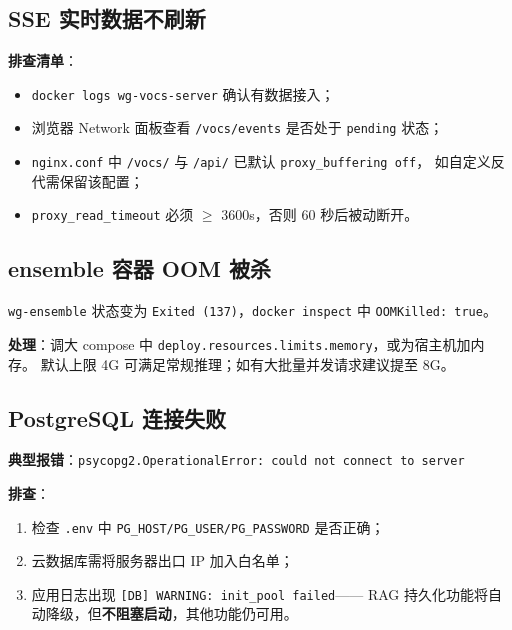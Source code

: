 \documentclass[UTF8,a4paper,11pt]{ctexart}
\begin{document}
\subsection{SSE 实时数据不刷新}

\textbf{排查清单}：
\begin{itemize}[leftmargin=1.4em,itemsep=2pt]
  \item \texttt{docker logs wg-vocs-server} 确认有数据接入；
  \item 浏览器 Network 面板查看 \texttt{/vocs/events} 是否处于 \texttt{pending} 状态；
  \item \texttt{nginx.conf} 中 \texttt{/vocs/} 与 \texttt{/api/} 已默认 \texttt{proxy\_buffering off}，
        如自定义反代需保留该配置；
  \item \texttt{proxy\_read\_timeout} 必须 $\geq$ 3600s，否则 60 秒后被动断开。
\end{itemize}

\subsection{ensemble 容器 OOM 被杀}

\begin{dangerbox}[现象]
\texttt{wg-ensemble} 状态变为 \texttt{Exited (137)}，\texttt{docker inspect} 中
\texttt{OOMKilled: true}。
\end{dangerbox}

\textbf{处理}：调大 compose 中 \texttt{deploy.resources.limits.memory}，或为宿主机加内存。
默认上限 4G 可满足常规推理；如有大批量并发请求建议提至 8G。

\subsection{PostgreSQL 连接失败}

\textbf{典型报错}：\texttt{psycopg2.OperationalError: could not connect to server}

\textbf{排查}：
\begin{enumerate}[leftmargin=1.6em,itemsep=2pt]
  \item 检查 \texttt{.env} 中 \texttt{PG\_HOST/PG\_USER/PG\_PASSWORD} 是否正确；
  \item 云数据库需将服务器出口 IP 加入白名单；
  \item 应用日志出现 \texttt{[DB] WARNING: init\_pool failed}——
        RAG 持久化功能将自动降级，但\textbf{不阻塞启动}，其他功能仍可用。
\end{enumerate}
\end{document}
